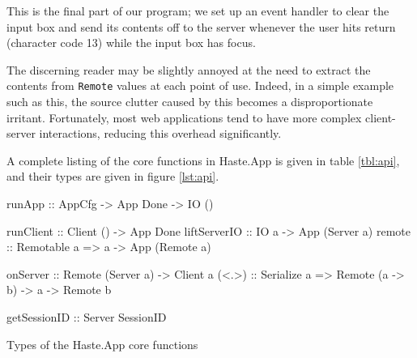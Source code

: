 \documentclass[preprint]{sigplanconf}
\begin{document}

This is the final part of our program; we set up an event handler to clear the
input box and send its contents off to the server whenever the user hits return
(character code 13) while the input box has focus.

The discerning reader may be slightly annoyed at the need to extract the
contents from \lstinline!Remote! values at each point of use. Indeed, in a
simple example such as this, the source clutter caused by this becomes a
disproportionate irritant. Fortunately, most web applications tend to have
more complex client-server interactions, reducing this overhead significantly.

A complete listing of the core functions in Haste.App is given in table
\ref{tbl:api}, and their types are given in figure \ref{lst:api}.

\begin{listingfloat}
\begin{code}
runApp       :: AppCfg -> App Done -> IO ()

runClient    :: Client () -> App Done
liftServerIO :: IO a -> App (Server a)
remote       :: Remotable a
             => a -> App (Remote a)

onServer     :: Remote (Server a) -> Client a
(<.>)        :: Serialize a
             => Remote (a -> b) -> a -> Remote b

getSessionID :: Server SessionID
\end{code}
\caption{Types of the Haste.App core functions}
\label{lst:api}
\end{listingfloat}
\end{document}
